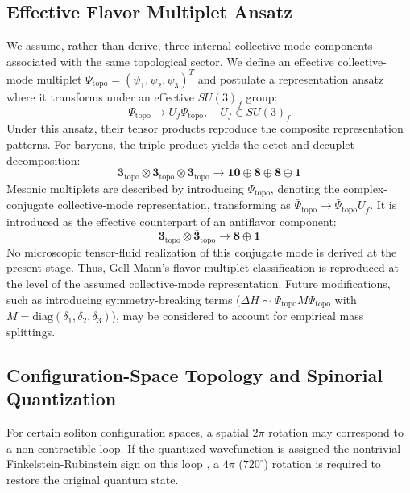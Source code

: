 \documentclass[reprint,amsmath,amssymb,aps,prd]{revtex4-2}
\begin{document}
\subsection{Effective Flavor Multiplet Ansatz}
We assume, rather than derive, three internal collective-mode components associated with the same topological sector. We define an effective collective-mode multiplet $\Psi_{\mathrm{topo}} = (\psi_1, \psi_2, \psi_3)^T$ and postulate a representation ansatz where it transforms under an effective $SU(3)_f$ group:
\begin{equation}
\Psi_{\mathrm{topo}} \rightarrow U_f \Psi_{\mathrm{topo}}, \quad U_f \in SU(3)_f
\end{equation}
Under this ansatz, their tensor products reproduce the composite representation patterns. For baryons, the triple product yields the octet and decuplet decomposition:
\begin{equation}
\mathbf{3}_{\mathrm{topo}} \otimes \mathbf{3}_{\mathrm{topo}} \otimes \mathbf{3}_{\mathrm{topo}} \to \mathbf{10} \oplus \mathbf{8} \oplus \mathbf{8} \oplus \mathbf{1}
\end{equation}
Mesonic multiplets are described by introducing $\bar{\Psi}_{\mathrm{topo}}$, denoting the complex-conjugate collective-mode representation, transforming as $\bar{\Psi}_{\mathrm{topo}} \rightarrow \bar{\Psi}_{\mathrm{topo}} U_f^\dagger$. It is introduced as the effective counterpart of an antiflavor component:
\begin{equation}
\mathbf{3}_{\mathrm{topo}} \otimes \bar{\mathbf{3}}_{\mathrm{topo}} \to \mathbf{8} \oplus \mathbf{1}
\end{equation}
No microscopic tensor-fluid realization of this conjugate mode is derived at the present stage. Thus, Gell-Mann's flavor-multiplet classification \cite{GellMann1964} is reproduced at the level of the assumed collective-mode representation. Future modifications, such as introducing symmetry-breaking terms ($\Delta H \sim \bar{\Psi}_{\mathrm{topo}} M \Psi_{\mathrm{topo}}$ with $M = \mathrm{diag}(\delta_1, \delta_2, \delta_3)$), may be considered to account for empirical mass splittings.

\subsection{Configuration-Space Topology and Spinorial Quantization}
For certain soliton configuration spaces, a spatial $2\pi$ rotation may correspond to a non-contractible loop. If the quantized wavefunction is assigned the nontrivial Finkelstein-Rubinstein sign on this loop \cite{Finkelstein1968}, a $4\pi$ ($720^\circ$) rotation is required to restore the original quantum state.
\end{document}
